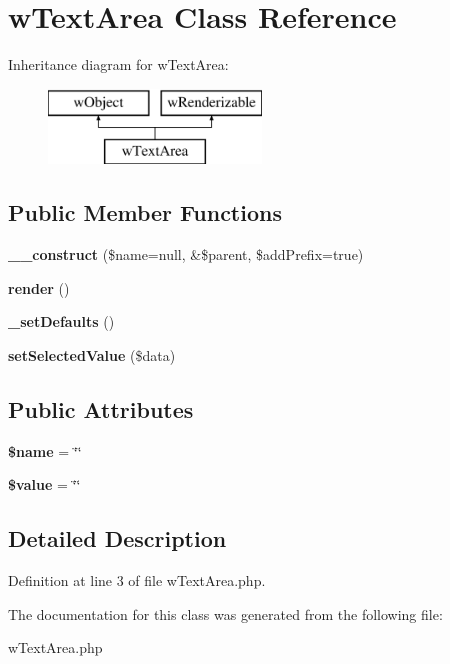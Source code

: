 \hypertarget{classwTextArea}{
\section{wTextArea Class Reference}
\label{classwTextArea}
}
Inheritance diagram for wTextArea:\begin{figure}[H]
\begin{center}
\leavevmode
\includegraphics[height=2.000000cm]{classwTextArea}
\end{center}
\end{figure}
\subsection*{Public Member Functions}
\begin{DoxyCompactItemize}
\item 
\hypertarget{classwTextArea_ac2bb1f60b5a304b790e972637bd102c0}{
{\bfseries \_\-\_\-construct} (\$name=null, \&\$parent, \$addPrefix=true)}
\label{classwTextArea_ac2bb1f60b5a304b790e972637bd102c0}

\item 
\hypertarget{classwTextArea_ab09b8b2d77923bbb1ce7d043e0e34142}{
{\bfseries render} ()}
\label{classwTextArea_ab09b8b2d77923bbb1ce7d043e0e34142}

\item 
\hypertarget{classwTextArea_a5c3f2a4563ab1bd286a2a90889eecb2e}{
{\bfseries \_\-setDefaults} ()}
\label{classwTextArea_a5c3f2a4563ab1bd286a2a90889eecb2e}

\item 
\hypertarget{classwTextArea_afca9ef9f3e02351c34cf4c48c0daf123}{
{\bfseries setSelectedValue} (\$data)}
\label{classwTextArea_afca9ef9f3e02351c34cf4c48c0daf123}

\end{DoxyCompactItemize}
\subsection*{Public Attributes}
\begin{DoxyCompactItemize}
\item 
\hypertarget{classwTextArea_a32a593b28a7dfaadf235b7a609ecccdb}{
{\bfseries \$name} = \char`\"{}\char`\"{}}
\label{classwTextArea_a32a593b28a7dfaadf235b7a609ecccdb}

\item 
\hypertarget{classwTextArea_a422280ac1718e5e38f582a6892e9528a}{
{\bfseries \$value} = \char`\"{}\char`\"{}}
\label{classwTextArea_a422280ac1718e5e38f582a6892e9528a}

\end{DoxyCompactItemize}


\subsection{Detailed Description}


Definition at line 3 of file wTextArea.php.



The documentation for this class was generated from the following file:\begin{DoxyCompactItemize}
\item 
wTextArea.php\end{DoxyCompactItemize}
